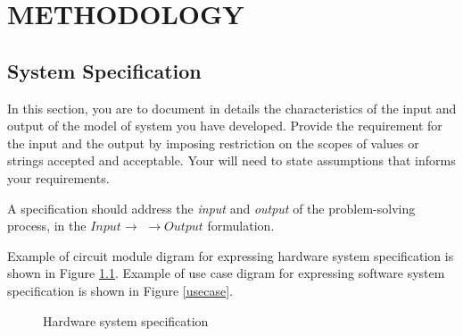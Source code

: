 \chapter{\large METHODOLOGY}
\thispagestyle{empty}

\section{System Specification} 

In this section, you are to document in details the characteristics of the input and output of the model of system you have developed. Provide the requirement for the input and the output by imposing restriction on the scopes of values or strings accepted and acceptable. Your will need to state assumptions that informs your requirements.

A specification should address the \textit{input} and \textit{output} of the problem-solving process, in the $Input \rightarrow$  $\rightarrow Output$ formulation. 

Example of circuit module digram for expressing hardware system specification is shown in Figure \ref{HarwareSpec}. Example of use case digram for expressing software system specification is shown in Figure \ref{usecase}. 

 
\begin{figure}[!h]
	\centering
	\caption{Hardware system specification}
	\label{HarwareSpec}
\end{figure}



